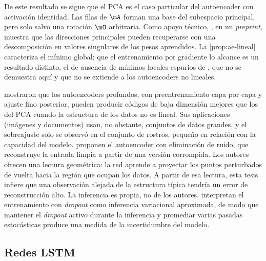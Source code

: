 De este resultado se sigue que el PCA es el caso particular del autoencoder con activación
identidad. Las filas de $\mA$ forman una base del subespacio principal, pero solo salvo una
rotación $\mO$ arbitraria. Como apoyo técnico,
\textcite{plaut_2018}, en un \emph{preprint},
muestra que las direcciones principales pueden recuperarse con una descomposición en valores
singulares de los pesos aprendidos. La \cref{prop:ae-lineal} caracteriza el mínimo global; que el
entrenamiento por gradiente lo alcance es un resultado distinto, el de ausencia de mínimos locales
espurios de \textcite{baldi_hornik_1989}, que no se demuestra aquí y que no se extiende a los
autoencoders no lineales.

\textcite{hinton_salakhutdinov_2006} mostraron que los autoencoders profundos, con
preentrenamiento capa por capa y ajuste fino posterior, pueden producir códigos de baja dimensión
mejores que los del PCA cuando la estructura de los datos no es lineal. Sus aplicaciones (imágenes
y documentos) usan, no obstante, conjuntos de datos grandes, y el sobreajuste solo se observó en el
conjunto de rostros, pequeño en relación con la capacidad del modelo.
\textcite{vincent_et_al_2008} proponen el autoencoder con
eliminación de ruido, que reconstruye la entrada limpia a partir de una versión corrompida. Los
autores ofrecen una lectura geométrica: la red aprende a proyectar los puntos perturbados de vuelta
hacia la región que ocupan los datos. A partir de esa lectura, esta tesis infiere que una
observación alejada de la estructura típica tendría un error de reconstrucción alto. La inferencia
es propia, no de los autores. \textcite{gal_ghahramani_2016} interpretan el entrenamiento con \emph{dropout} como
inferencia variacional aproximada, de modo que mantener el \emph{dropout} activo durante la
inferencia y promediar varias pasadas estocásticas produce una medida de la incertidumbre del
modelo.

\subsection{Redes LSTM}

